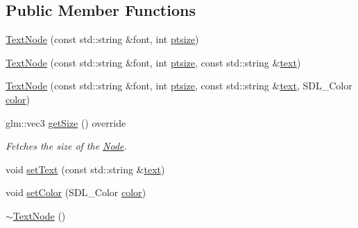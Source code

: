 \subsection*{Public Member Functions}
\begin{DoxyCompactItemize}
\item 
\mbox{\hyperlink{classsage_1_1TextNode_a5fbde25db3407b5e5e84ef297821dec6}{Text\+Node}} (const std\+::string \&font, int \mbox{\hyperlink{classsage_1_1TextNode_a1811c136026bea8ba6f27184e2d53c0c}{ptsize}})
\item 
\mbox{\hyperlink{classsage_1_1TextNode_a9988fa03958e378b3fd612ea3a103649}{Text\+Node}} (const std\+::string \&font, int \mbox{\hyperlink{classsage_1_1TextNode_a1811c136026bea8ba6f27184e2d53c0c}{ptsize}}, const std\+::string \&\mbox{\hyperlink{classsage_1_1TextNode_a2828e281a4ea3cce151de7cc983ca2c0}{text}})
\item 
\mbox{\hyperlink{classsage_1_1TextNode_a5677717ec6c2db9e311a40ad1510adb9}{Text\+Node}} (const std\+::string \&font, int \mbox{\hyperlink{classsage_1_1TextNode_a1811c136026bea8ba6f27184e2d53c0c}{ptsize}}, const std\+::string \&\mbox{\hyperlink{classsage_1_1TextNode_a2828e281a4ea3cce151de7cc983ca2c0}{text}}, S\+D\+L\+\_\+\+Color \mbox{\hyperlink{classsage_1_1TextNode_a08cbe2019a8aef4f1bd17a3f73a04d27}{color}})
\item 
glm\+::vec3 \mbox{\hyperlink{classsage_1_1TextNode_acdfcc350ceb004d934ab731ad9d1e176}{get\+Size}} () override
\begin{DoxyCompactList}\small\item\em Fetches the size of the \mbox{\hyperlink{classsage_1_1Node}{Node}}. \end{DoxyCompactList}\item 
void \mbox{\hyperlink{classsage_1_1TextNode_a81f9aa6c3c25d5b2b53904becad654fe}{set\+Text}} (const std\+::string \&\mbox{\hyperlink{classsage_1_1TextNode_a2828e281a4ea3cce151de7cc983ca2c0}{text}})
\item 
void \mbox{\hyperlink{classsage_1_1TextNode_a46a1738c681f158ab1d2468d3ec02a24}{set\+Color}} (S\+D\+L\+\_\+\+Color \mbox{\hyperlink{classsage_1_1TextNode_a08cbe2019a8aef4f1bd17a3f73a04d27}{color}})
\item 
\mbox{\hyperlink{classsage_1_1TextNode_a3ad8241316536959f2727a0abb8dc3e7}{$\sim$\+Text\+Node}} ()
\end{DoxyCompactItemize}
